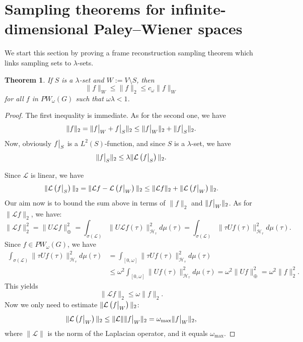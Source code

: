 \documentclass[12pt]{amsart}
\newtheorem{theorem}{Theorem}[section]
\theoremstyle{definition}
\numberwithin{equation}{section}
\newcommand\restr[2]{{%
  \left.\kern-\nulldelimiterspace %
  #1 %
  \vphantom{\big|} %
  \right|_{#2} %
  }}
\theoremstyle{definition}
\theoremstyle{remark}
\numberwithin{equation}{section}
\begin{document}
\section{Sampling theorems for infinite-dimensional Paley--Wiener spaces}
We start this section by proving a frame reconstruction sampling theorem which links sampling sets to $\lambda$-sets. 
\begin{theorem}
\label{belteorema}
    If $S$ is a $\lambda$-set and $W:= V\setminus S$, then
    \begin{equation}
       \|f\|_{W} \leq \|f\|_2 \leq c_\omega\|f\|_W 
    \end{equation}  
    for all $f$ in $PW_\omega(G)$ such that $\omega\lambda < 1$.
\end{theorem}
\begin{proof}
    The first inequality is immediate. As for the second one, we have
    $$
    \|f\|_2 = \|\restr{f}{W} + \restr{f}{S}\|_2 \leq \|\restr{f}{W}\|_2 + \|\restr{f}{S}\|_2.
    $$
    Now, obviously $\restr{f}{S}$ is a $L^2(S)$-function, and since $S$ is a $\lambda$-set, we have
    \begin{equation}
    \label{1}
       \|\restr{f}{S}\|_2 \leq \lambda \|\mathcal{L}\left(\restr{f}{S}\right)\|_2. 
    \end{equation}
    
    Since $\mathcal{L}$ is linear, we have
    $$
    \|\mathcal{L}\left(\restr{f}{S}\right)\|_2 =  \|\mathcal{L}f - \mathcal{L}\left(\restr{f}{W}\right)\|_2 \leq \|\mathcal{L}f\|_2 + \|\mathcal{L}\left(\restr{f}{W}\right)\|_2.
    $$
    Our aim now is to bound the sum above in terms of $\|f\|_2$ and $\|\restr{f}{W}\|_2$. As for $\|\mathcal{L}f\|_2$, we have:
    $$
               \|\mathcal{L}f\|_2^2 = \|U\mathcal{L}f\|_\oplus^2 = \int_{\sigma(\mathcal{L})}\|U\mathcal{L}f(\tau)\|^2_{\mathcal{H}_\tau}d\mu(\tau) = \int_{\sigma(\mathcal{L})}\|\tau Uf(\tau)\|^2_{\mathcal{H}_\tau}d\mu(\tau).
    $$
    Since $f \in PW_\omega(G)$, we have
    $$
    \begin{aligned}
     \int_{\sigma(\mathcal{L})}\|\tau Uf(\tau)\|^2_{\mathcal{H}_\tau}d\mu(\tau) &= \int_{[0, \omega]}\|\tau Uf(\tau)\|^2_{\mathcal{H}_\tau}d\mu(\tau) \\
    &\leq \omega^2\int_{[0, \omega]}\| Uf(\tau)\|^2_{\mathcal{H}_\tau}d\mu(\tau) = \omega^2\|Uf\|^2_\oplus = \omega^2\|f\|^2_2.   
    \end{aligned}
    $$
    This yields
    \begin{equation}
    \label{2}
    \|\mathcal{L}f\|_2 \leq \omega\|f\|_2.
    \end{equation}
    Now we only need to estimate $\|\mathcal{L}\left(\restr{f}{W}\right)\|_2$:
    \begin{equation}
    \label{3}
     \|\mathcal{L}\left(\restr{f}{W}\right)\|_2 \leq \|\mathcal{L}\|\|\restr{f}{W}\|_2 = \omega_\mathrm{max}\|\restr{f}{W}\|_2,
    \end{equation}
    where $\|\mathcal{L}\|$ is the norm of the Laplacian operator, and it equals $\omega_{\mathrm{max}}$.
    

\end{proof}
\end{document}
